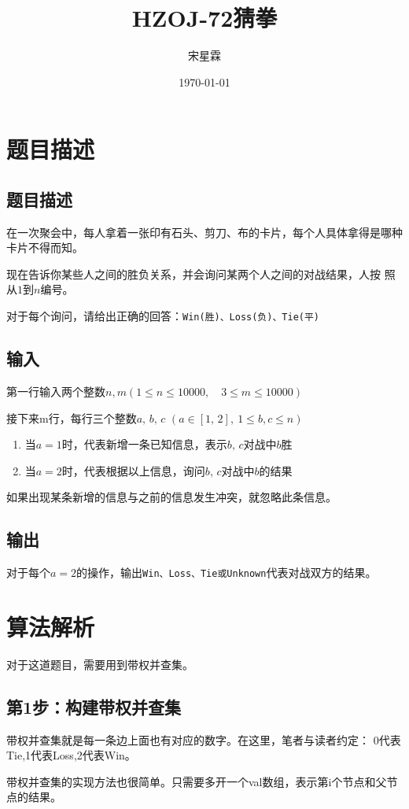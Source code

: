 \documentclass{note}
\title{HZOJ-72猜拳}
\author{宋星霖}
\date{\today}
\begin{document}
\maketitle
\section{题目描述}
\begin{leftbar}
\subsection{题目描述}
​在一次聚会中，每人拿着一张印有石头、剪刀、布的卡片，每个人具体拿得是哪种卡片不得而知。

​现在告诉你某些人之间的胜负关系，并会询问某两个人之间的对战结果，人按
照从$1$到$n$编号。

​对于每个询问，请给出正确的回答：\verb|Win(胜)、Loss(负)、Tie(平)|
\subsection{输入}
第一行输入两个整数$n,m(1 \leq n\leq10000,\quad
3\leq m \leq 10000)$

接下来m行，每行三个整数$a,\,b,\,c$
$\left( a \in \left[ 1, \, 2 \right], \: 1 \leq b,c\leq n\right)$
\begin{enumerate}
\item 当$a=1$时，代表新增一条已知信息，表示$b,\,c$对战中$b$胜
\item 当$a=2$时，代表根据以上信息，询问$b,\,c$对战中$b$​的结果
\end{enumerate}
如果出现某条新增的信息与之前的信息发生冲突，就忽略此条信息。
\subsection{输出}
对于每个$a=2$的操作，输出\verb|Win、Loss、Tie或Unknown|代表对战双方的结果。
\end{leftbar}
\section{算法解析}
对于这道题目，需要用到带权并查集。

\subsection{第1步：构建带权并查集}
带权并查集就是每一条边上面也有对应的数字。在这里，笔者与读者约定：
0代表Tie,1代表Loss,2代表Win。

带权并查集的实现方法也很简单。只需要多开一个val数组，表示第i个节点和父节点的结果。
\end{document}
